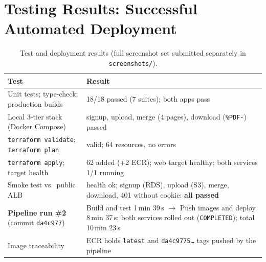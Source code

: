 \documentclass[11pt,a4paper]{article}
\begin{document}
\section{Testing Results: Successful Automated Deployment}
\begin{table}[H]
\centering\footnotesize
\begin{tabularx}{\textwidth}{L{6.4cm}X}
\toprule
\textbf{Test} & \textbf{Result}\\
\midrule
Unit tests; type-check; production builds & 18/18 passed (7 suites); both apps pass\\
Local 3-tier stack (Docker Compose) & signup, upload, merge (4 pages), download (\texttt{\%PDF-}) passed\\
\texttt{terraform validate}; \texttt{terraform plan} & valid; 64 resources, no errors\\
\texttt{terraform apply}; target health & 62 added (+2 ECR); web target healthy; both services 1/1 running\\
Smoke test vs.\ public ALB & health ok; signup (RDS), upload (S3), merge, download, 401 without cookie: \textbf{all passed}\\
\textbf{Pipeline run \#2} (commit \texttt{da4c977}) & Build and test 1\,min 39\,s $\rightarrow$ Push images and deploy 8\,min 37\,s; both services rolled out (\texttt{COMPLETED}); total 10\,min 23\,s\\
Image traceability & ECR holds \texttt{latest} and \texttt{da4c9775\ldots} tags pushed by the pipeline\\
\bottomrule
\end{tabularx}
\caption{Test and deployment results (full screenshot set submitted separately in \texttt{screenshots/}).}
\end{table}
\end{document}
